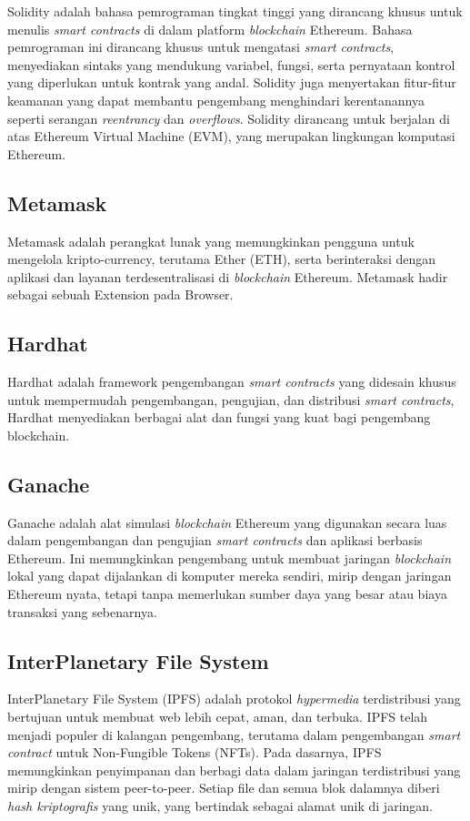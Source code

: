 Solidity adalah bahasa pemrograman tingkat tinggi yang dirancang khusus untuk menulis \emph{smart contracts} di dalam platform \emph{blockchain} Ethereum. Bahasa pemrograman ini dirancang khusus untuk mengatasi \emph{smart contracts}, menyediakan sintaks yang mendukung variabel, fungsi, serta pernyataan kontrol yang diperlukan untuk kontrak yang andal. Solidity juga menyertakan fitur-fitur keamanan yang dapat membantu pengembang menghindari kerentanannya seperti serangan \emph{reentrancy} dan \emph{overflows}. Solidity dirancang untuk berjalan di atas Ethereum Virtual Machine (EVM), yang merupakan lingkungan komputasi Ethereum.

\subsection{Metamask}

Metamask adalah perangkat lunak yang memungkinkan pengguna untuk mengelola kripto-currency, terutama Ether (ETH), serta berinteraksi dengan aplikasi dan layanan terdesentralisasi di \emph{blockchain} Ethereum. Metamask hadir sebagai sebuah Extension pada Browser. 

\subsection{Hardhat}

Hardhat adalah framework pengembangan \emph{smart contracts} yang didesain khusus untuk mempermudah pengembangan, pengujian, dan distribusi \emph{smart contracts}, Hardhat menyediakan berbagai alat dan fungsi yang kuat bagi pengembang blockchain.

\subsection{Ganache}

Ganache adalah alat simulasi \emph{blockchain} Ethereum yang digunakan secara luas dalam pengembangan dan pengujian \emph{smart contracts} dan aplikasi berbasis Ethereum. Ini memungkinkan pengembang untuk membuat jaringan \emph{blockchain} lokal yang dapat dijalankan di komputer mereka sendiri, mirip dengan jaringan Ethereum nyata, tetapi tanpa memerlukan sumber daya yang besar atau biaya transaksi yang sebenarnya.

\subsection{InterPlanetary File System}
InterPlanetary File System (IPFS) adalah protokol \emph{hypermedia} terdistribusi yang bertujuan untuk membuat web lebih cepat, aman, dan terbuka. IPFS telah menjadi populer di kalangan pengembang, terutama dalam pengembangan \emph{smart contract} untuk Non-Fungible Tokens (NFTs). Pada dasarnya, IPFS memungkinkan penyimpanan dan berbagi data dalam jaringan terdistribusi yang mirip dengan sistem peer-to-peer. Setiap file dan semua blok dalamnya diberi \emph{hash kriptografis} yang unik, yang bertindak sebagai alamat unik di jaringan.

